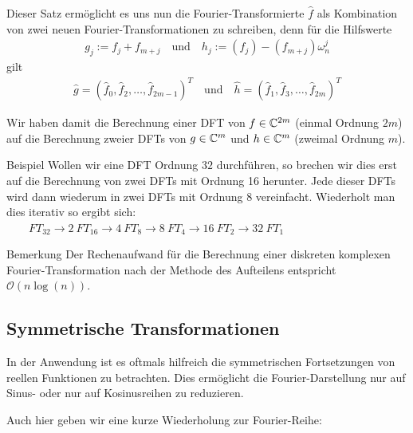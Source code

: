 Dieser Satz ermöglicht es uns nun die Fourier-Transformierte $\hat{f}$ als Kombination von zwei neuen 
Fourier-Transformationen zu schreiben, denn für die Hilfswerte
%
\begin{align*}
  g_{j} := f_j + f_{m+j} 
  \quad \text{und}\quad 
  h_{j} := (f_j) - (f_{m+j})\omega_n^j
\end{align*}
%
gilt 
\begin{align*}
  \hat{g} = (\hat{f}_0,\hat{f}_2,\dots,\hat{f}_{2m-1})^T 
  \quad\text{und}\quad 
  \hat{h} = (\hat{f}_1,\hat{f}_3,\dots,\hat{f}_{2m})^T 
\end{align*}

Wir haben damit die Berechnung einer DFT von $f\in\mathbb C^{2m}$ (einmal Ordnung $2m$) auf die Berechnung zweier DFTs von 
$g\in\mathbb C^m$ und $h\in\mathbb C^m$ (zweimal Ordnung $m$). 

\begin{colbox}{Beispiel}
  Wollen wir eine DFT Ordnung $32$ durchführen, so brechen wir dies erst auf die Berechnung von zwei DFTs mit Ordnung 
  16 herunter. Jede dieser DFTs wird dann wiederum in zwei DFTs mit Ordnung 8 vereinfacht. Wiederholt man dies iterativ 
  so ergibt sich:\\
  $
  \qquad FT_{32} 
  \rightarrow 2\ FT_{16} 
  \rightarrow 4\ FT_{8} 
  \rightarrow 8\ FT_{4} 
  \rightarrow 16\ FT_{2} 
  \rightarrow 32\ FT_{1}
  $
\end{colbox}

\begin{colbox}{Bemerkung}
  Der Rechenaufwand für die Berechnung einer diskreten komplexen Fourier-Transformation nach der Methode des Aufteilens
  entspricht $\mathcal{O}(n\log(n))$.
\end{colbox}

\subsection{Symmetrische Transformationen}
In der Anwendung ist es oftmals hilfreich die symmetrischen Fortsetzungen von reellen Funktionen zu betrachten. Dies 
ermöglicht die Fourier-Darstellung nur auf Sinus- oder nur auf Kosinusreihen zu reduzieren.

Auch hier geben wir eine kurze Wiederholung zur Fourier-Reihe:

